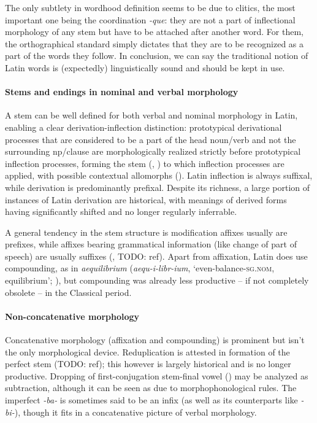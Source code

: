 \documentclass[a4paper, oneside, 12pt]{report}
\newcommand*{\citesec}[1]{\S~{#1}}
\newcommand{\form}[1]{\emph{#1}}
\newcommand*{\category}[1]{\textsc{#1}}
\newcommand{\translate}[1]{`#1'}
\begin{document}
The only subtlety in wordhood definition seems to be due to clitics, 
the most important one being the coordination \form{-que}: 
they are not a part of inflectional morphology of any stem 
but have to be attached after another word.
For them, the orthographical standard simply dictates that 
they are to be recognized as a part of the words they follow. 
In conclusion, we can say the traditional notion of Latin words 
is (expectedly) linguistically sound 
and should be kept in use.

\paragraph*{Stems and endings in nominal and verbal morphology}

A stem can be well defined for both verbal and nominal morphology in Latin,
enabling a clear derivation-inflection distinction:
prototypical derivational processes that are considered 
to be a part of the head noun/verb 
and not the surrounding \acs{np}/clause
are morphologically realized strictly 
before prototypical inflection processes,
forming the stem 
(,
) to which 
inflection processes are applied,
with possible contextual allomorphs
(). 
Latin inflection is always suffixal,
while derivation is predominantly prefixal.
Despite its richness, 
a large portion of instances of Latin derivation are historical,
with meanings of derived forms 
having significantly shifted and no longer regularly inferrable.

A general tendency in the stem structure 
is modification affixes usually are prefixes,
while affixes bearing grammatical information 
(like change of part of speech) 
are usually suffixes
(, TODO: ref).
Apart from affixation,
Latin does use compounding, as in \form{aequilibrium} 
(\form{aequ-i-libr-ium}, \translate{even-balance-\category{sg.nom}, equilibrium};
\citealt[\citesec{92}]{smith2016greek}),
but compounding was already less productive -- if not completely obsolete --
in the Classical period.

\paragraph*{Non-concatenative morphology}

Concatenative morphology (affixation and compounding) 
is prominent but isn't the only morphological device.
Reduplication is attested in 
formation of the perfect stem (TODO: ref);
this however is largely historical 
and is no longer productive.
Dropping of first-conjugation stem-final vowel ()
may be analyzed as subtraction,
although it can be seen as due to morphophonological rules.
The imperfect \form{-ba-} is sometimes said to be an infix 
(as well as its counterparts like \form{-bi-}),
though it fits in a concatenative picture of verbal morphology.
\end{document}
